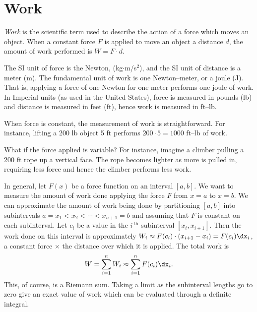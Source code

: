 \section{Work}\label{sec:work}

\textit{Work} is the scientific term used to describe the action of a force which moves an object. When a constant force $F$ is applied to move an object a distance $d$, the amount of work performed is $W=F\cdot d$. 

The SI unit of force is the Newton, (kg$\cdot$m/s$^2$), and the SI unit of distance is a meter (m). The fundamental unit of work is one Newton--meter, or a joule (J). That is, applying a force of one Newton for one meter performs one joule of work. In Imperial units (as used in the United States), force is measured in pounds (lb) and distance is measured in feet (ft), hence work is measured in ft--lb. 


When force is constant, the measurement of work is straightforward. For instance, lifting a 200 lb object 5 ft performs $200\cdot 5 = 1000$ ft--lb of work. 

What if the force applied is variable? For instance, imagine a climber pulling a 200 ft rope up a vertical face. The rope becomes lighter as more is pulled in, requiring less force and hence the climber performs less work.

In general, let $F(x)$ be a force function on an interval $[a,b]$. We want to measure the amount of work done applying the force $F$ from $x=a$ to $x=b$. We can approximate the amount of work being done by partitioning $[a,b]$ into subintervals $a=x_1<x_2 <\cdots <x_{n+1}=b$ and assuming that $F$ is constant on each subinterval. Let $c_i$ be a value in the $i\,^{\text{th}}$ subinterval $[x_i,x_{i+1}]$. Then the work done on this interval is approximately $W_i\approx F(c_i)\cdot(x_{i+1}-x_i) = F(c_i)\dx_i$, a constant force $\times$ the distance over which it is applied. The total work is 
$$ W = \sum_{i=1}^n W_i \approx \sum_{i=1}^n F(c_i)\dx_i.$$
This, of course, is a Riemann sum. Taking a limit as the subinterval lengths go to zero give an exact value of work which can be evaluated through a definite integral.

